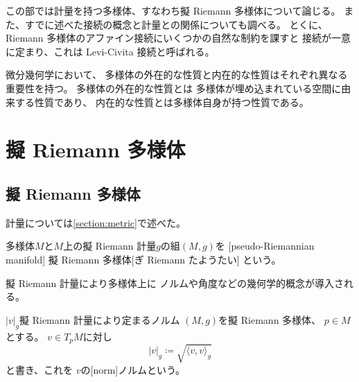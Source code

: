 \documentclass[report]{jlreq}
\begin{document}
この部では計量を持つ多様体、すなわち擬 Riemann 多様体について論じる。
また、すでに述べた接続の概念と計量との関係についても調べる。
とくに、Riemann 多様体のアファイン接続にいくつかの自然な制約を課すと
接続が一意に定まり、これは Levi-Civita 接続と呼ばれる。

微分幾何学において、
多様体の外在的な性質と内在的な性質はそれぞれ異なる重要性を持つ。
多様体の外在的な性質とは
多様体が埋め込まれている空間に由来する性質であり、
内在的な性質とは多様体自身が持つ性質である。
\TODO{}

%
\chapter{擬 Riemann 多様体}

%
\section{擬 Riemann 多様体}

計量については\cref{section:metric}で述べた。

\begin{definition}
    多様体$M$と$M$上の擬 Riemann 計量$g$の組$(M, g)$を
    [pseudo-Riemannian manifold]
        {擬 Riemann 多様体}[ぎ Riemann たようたい]
    という。
\end{definition}

擬 Riemann 計量により多様体上に
ノルムや角度などの幾何学的概念が導入される。

\begin{definition}[ノルム]
        {$|v|_g$}{擬 Riemann 計量により定まるノルム}
    $(M, g)$を擬 Riemann 多様体、
    $p \in M$とする。
    $v \in T_p M$に対し
    \begin{equation}
        |v|_g \coloneqq \sqrt{\langle v, v \rangle_g}
    \end{equation}
    と書き、これを
    $v$の[norm]{ノルム}という。
\end{definition}

\begin{definition}[角度]
    \TODO{}
\end{definition}
\end{document}
